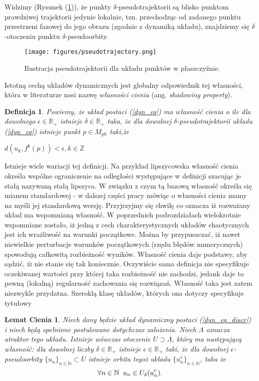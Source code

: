 \documentclass[12pt]{article}
\newtheorem{defi}{Definicja}
\newtheorem{lem}{Lemat Cienia}
\begin{document}
Widzimy (Rysunek (\ref{Fig14})), że punkty $\delta$-pseudotrajektorii są blisko punktom prawdziwej trajektorii jedynie lokalnie, tzn. przechodząc od zadanego punktu przestrzeni fazowej do jego obrazu (zgodnie z dynamiką układu), znajdziemy się $\delta$-otoczeniu punktu $\delta$-pseudoorbity. 
\begin{figure}[H]
	\texttt{[image: figures/pseudotrajectory.png]} 
	\centering
	\caption{Ilustracja pseudotrajektorii dla układu punktów w płaszczyźnie.}
	\label{Fig14}
\end{figure}
Istotną cechą układów dynamicznych jest globalny odpowiednik tej własności, która w literaturze nosi nazwę \textit{własności cienia} (ang. \textit{shadowing property}).
\begin{defi}\label{shadowing_property}
	Powiemy, że układ postaci (\ref{dyn_eq}) ma własność cienia o ile dla dowolnego $ \epsilon \in \mathbb{R}_{+} $ istnieje $ \delta \in \mathbb{R}_{+} $ taka, że dla dowolnej $\delta$-pseudotrajektorii układu (\ref{dyn_eq}) istnieje punkt $ p \in M_{ph} $ taki,że
	\begin{center}
		$ d(u_{k}, f^{k}(p)) < \epsilon, k \in \mathbb{Z}$
	\end{center}
\end{defi}
Istnieje wiele wariacji tej definicji. Na przykład lipszycowska własność cienia określa wspólne ograniczenie na odległości występujące w definicji szacując je stałą nazywaną stałą lipszyca. W związku z czym tą bazową własność określa się mianem standardowej - w dalszej części pracy mówiąc o własności cienia mamy na myśli jej standardową wersję.\newline
Przyjrzyjmy się chwilę co oznacza iż rozważany układ ma wspomnianą własność. W poprzednich podrozdziałach wielokrotnie wspomniane zostało, iż jedną z cech charakterystycznych układów chaotycznych jest ich wrażliwość na warunki początkowe. Można by przypuszczać, iż nawet niewielkie perturbacje warunków początkowych (rzędu błędów numerycznych) spowodują całkowitą rozbieżność wyników. Własność cienia daje podstawy, aby sądzić, iż nie stanie się tak koniecznie. Oczywiście sama definicja nie specyfikuje oczekiwanej wartości przy której taka rozbieżność nie zachodzi, jedank daje to pewną (lokalną) regularność zachowania się rozwiązań. Własność taka jest zatem niezwykle przydatna. Szeroklą klasę układów, których ona dotyczy specyfikuje tytułowy
\begin{lem}
Niech dany będzie układ dynamiczny postaci (\ref{dyn_eq_discr}) i niech będą spełnione postulowane dotychczas założenia. Niech $\Lambda$ oznacza atraktor tego układu. Istnieje wówczas otoczenie $ U \supset \Lambda $, który ma następującą własność: dla dowolnej liczby $\delta \in \mathbb{R}_{+}$ istnieje $\epsilon \in \mathbb{R}_{+}$  taki, że dla dowolnej $\epsilon$-pseudoorbity $ \{u_{n}\}_{n \in \mathbb{N}} \subset U $ istnieje orbita tegoż układu $ \{u^{r}_{n}\}_{n \in \mathbb{N}} $, taka że
\begin{equation}
\forall{n \in \mathbb{N}} \thickspace \thickspace u_{n} \in U_{\delta}(u^{r}_{n}).
\end{equation}
\end{lem}
\end{document}
